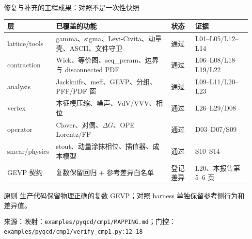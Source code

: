 \documentclass[UTF8,aspectratio=169,11pt]{ctexbeamer}
\newcommand{\source}[1]{\vspace{0.05em}\par{\raggedright\scriptsize\color{muted}来源：#1\par}}
\newcommand{\pass}{\textcolor{evidence}{通过}}
\newcommand{\diffmark}{\textcolor{warning}{登记差异}}
\begin{document}
\begin{frame}[t]{修复与补充的工程成果：对照不是一次性快照}
  \footnotesize
  \setlength{\tabcolsep}{2pt}
  \renewcommand{\arraystretch}{0.90}
  \begin{tabularx}{0.96\textwidth}{@{}
    >{\raggedright\arraybackslash}p{}
    >{\raggedright\arraybackslash}p{}
    >{\raggedright\arraybackslash}p{}
    Y@{}}
    \toprule
    层 & 已覆盖的功能 & 状态 & 证据\\
    \midrule
    lattice/tools & gamma、sigma、Levi-Civita、动量壳、ASCII、文件守卫 & \pass & L01--L05/L12--L14\\
    contraction & Wick、等价图、seq\_peram、边界与 disconnected PDF & \pass & L06--L08/L18--L19/L22\\
    analysis & Jackknife、meff、GEVP、分组、PFF/PDF 窗 & \pass & L09--L11/L20--L23\\
    vertex & 本征模压缩、噪声、VdV/VVV、相位 & \pass & L26--L29/D08\\
    operator & Clover、对偶、$\Delta G$、OPE Lorentz/FF & \pass & D03--D07/S09\\
    smear/physics & stout、动量涂抹相位、插值器、成本模型 & \pass & S10--S14\\
    GEVP 契约 & 复数保留回归 + 参考差异白名单 & \diffmark & L20、本报告第 5--6 页\\
    \bottomrule
  \end{tabularx}
  \begin{block}{原则}
    生产代码保留物理正确的复数 GEVP；对照 harness 单独保留参考侧行为和差异值。
  \end{block}
  \source{映射：\texttt{examples/pyqcd/cmp1/MAPPING.md}；门控：\texttt{examples/pyqcd/cmp1/verify\_cmp1.py:12--18}}
\end{frame}
\end{document}
